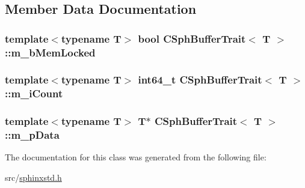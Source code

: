 \subsection{Member Data Documentation}
\hypertarget{classCSphBufferTrait_af0836984baad89098a039426e31e9d6c}{
\subsubsection[{m\-\_\-b\-Mem\-Locked}]{\setlength{\rightskip}{0pt plus 5cm}template$<$typename T$>$ bool {\bf C\-Sph\-Buffer\-Trait}$<$ T $>$\-::m\-\_\-b\-Mem\-Locked\hspace{0.3cm}{\ttfamily [protected]}}}\label{classCSphBufferTrait_af0836984baad89098a039426e31e9d6c}
\hypertarget{classCSphBufferTrait_acfcbe046add6dd1870d1378c1a041f6e}{
\subsubsection[{m\-\_\-i\-Count}]{\setlength{\rightskip}{0pt plus 5cm}template$<$typename T$>$ {\bf int64\-\_\-t} {\bf C\-Sph\-Buffer\-Trait}$<$ T $>$\-::m\-\_\-i\-Count\hspace{0.3cm}{\ttfamily [protected]}}}\label{classCSphBufferTrait_acfcbe046add6dd1870d1378c1a041f6e}
\hypertarget{classCSphBufferTrait_aefd0a2699b1ead938018859d8d7a3945}{
\subsubsection[{m\-\_\-p\-Data}]{\setlength{\rightskip}{0pt plus 5cm}template$<$typename T$>$ T$\ast$ {\bf C\-Sph\-Buffer\-Trait}$<$ T $>$\-::m\-\_\-p\-Data\hspace{0.3cm}{\ttfamily [protected]}}}\label{classCSphBufferTrait_aefd0a2699b1ead938018859d8d7a3945}


The documentation for this class was generated from the following file\-:\begin{DoxyCompactItemize}
\item 
src/\hyperlink{sphinxstd_8h}{sphinxstd.\-h}\end{DoxyCompactItemize}
